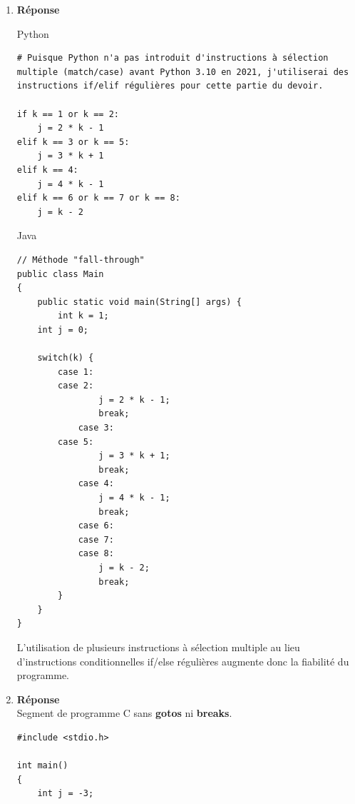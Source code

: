 \documentclass[12pt]{book}
\begin{document}
\newcommand{\reporttitle}{Devoir 4}
\newcommand{\reportauthorOne}{Kien Do}
\newcommand{\cidOne}{300163370}






\begin{enumerate}
    \item \textbf{Réponse}

Python
\begin{verbatim}
# Puisque Python n'a pas introduit d'instructions à sélection multiple (match/case) avant Python 3.10 en 2021, j'utiliserai des instructions if/elif régulières pour cette partie du devoir.

if k == 1 or k == 2:
    j = 2 * k - 1
elif k == 3 or k == 5:
    j = 3 * k + 1
elif k == 4:
    j = 4 * k - 1
elif k == 6 or k == 7 or k == 8:
    j = k - 2
\end{verbatim}
Java
\begin{verbatim}
// Méthode "fall-through"
public class Main
{
    public static void main(String[] args) {
        int k = 1;
	int j = 0;
	
	switch(k) {
	    case 1:
	    case 2:
                j = 2 * k - 1;
                break;
            case 3:
	    case 5:
                j = 3 * k + 1;
                break;
            case 4:
                j = 4 * k - 1;
                break;
            case 6:
            case 7:
            case 8:
                j = k - 2;
                break;
        }
    }
}
\end{verbatim}
L'utilisation de plusieurs instructions à sélection multiple au lieu d'instructions conditionnelles if/else régulières augmente donc la fiabilité du programme.

\newpage
    \item \textbf{Réponse}\\
    
Segment de programme C sans \textbf{gotos} ni \textbf{breaks}.
\begin{verbatim}
#include <stdio.h>

int main()
{
    int j = -3;
    

\end{verbatim}
\end{enumerate}
\end{document}
